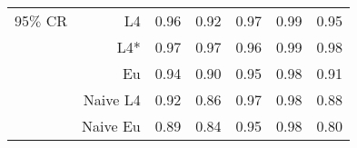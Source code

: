 \documentclass[a4paper,12pt,twoside]{book}
\begin{document}
\begin{table}[H]
\begin{tabular}{crrrrrr}
 {\color{blue} 95$\%$ CR }& L4  &0.96 & 0.92 & 0.97 & 0.99 & 0.95 \\ 
  
 
  &L4*  &    0.97 & 0.97 & 0.96 & 0.99 & 0.98 \\ 
  
&Eu &  0.94 & 0.90 & 0.95 & 0.98 & 0.91 \\ 
 
&Naive L4&    0.92 & 0.86 & 0.97 & 0.98 & 0.88 \\ 
 
&Naive Eu &    0.89 & 0.84 & 0.95 & 0.98 & 0.80 \\ 
 
\end{tabular}

\end{table}
\end{document}
